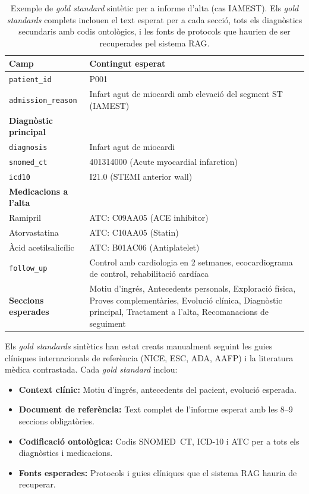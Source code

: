 \documentclass[CAT]{TFUOC}%
\begin{document}
\begin{table}[H]
\centering
\small
\begin{tabular}{p{4cm}p{9cm}}
\hline
\textbf{Camp} & \textbf{Contingut esperat} \\
\hline
\texttt{patient\_id} & P001 \\
\hline
\texttt{admission\_reason} & Infart agut de miocardi amb elevació del segment ST (IAMEST) \\
\hline
\textbf{Diagnòstic principal} & \\
\quad \texttt{diagnosis} & Infart agut de miocardi \\
\quad \texttt{snomed\_ct} & 401314000 (Acute myocardial infarction) \\
\quad \texttt{icd10} & I21.0 (STEMI anterior wall) \\
\hline
\textbf{Medicacions a l'alta} & \\
\quad Ramipril & ATC: C09AA05 (ACE inhibitor) \\
\quad Atorvastatina & ATC: C10AA05 (Statin) \\
\quad Àcid acetilsalicílic & ATC: B01AC06 (Antiplatelet) \\
\hline
\texttt{follow\_up} & Control amb cardiologia en 2 setmanes, ecocardiograma de control, rehabilitació cardíaca \\
\hline
\textbf{Seccions esperades} & Motiu d'ingrés, Antecedents personals, Exploració física, Proves complementàries, Evolució clínica, Diagnòstic principal, Tractament a l'alta, Recomanacions de seguiment \\
\hline
\end{tabular}
\caption{Exemple de \textit{gold standard} sintètic per a informe d'alta (cas IAMEST). Els \textit{gold standards} complets inclouen el text esperat per a cada secció, tots els diagnòstics secundaris amb codis ontològics, i les fonts de protocols que haurien de ser recuperades pel sistema RAG.}
\label{tab:gold-standard-example}
\end{table}

Els \textit{gold standards} sintètics han estat creats manualment seguint les guies clíniques internacionals de referència (NICE, ESC, ADA, AAFP) i la literatura mèdica contrastada. Cada \textit{gold standard} inclou:

\begin{itemize}
    \item \textbf{Context clínic:} Motiu d'ingrés, antecedents del pacient, evolució esperada.
    \item \textbf{Document de referència:} Text complet de l'informe esperat amb les 8--9 seccions obligatòries.
    \item \textbf{Codificació ontològica:} Codis SNOMED~CT, ICD-10 i ATC per a tots els diagnòstics i medicacions.
    \item \textbf{Fonts esperades:} Protocols i guies clíniques que el sistema RAG hauria de recuperar.
\end{itemize}
\end{document}
